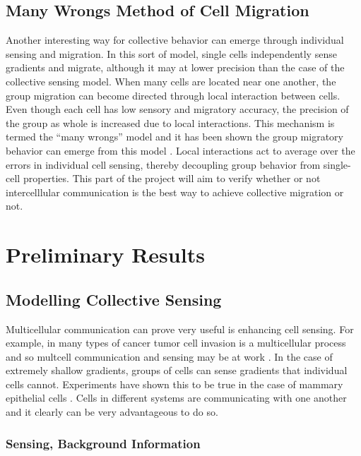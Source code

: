 \documentclass[a4paper]{article}
\begin{document}
\subsection{Many Wrongs Method of Cell Migration}

Another interesting way for collective behavior can emerge through individual sensing and migration. In this sort of model, single cells independently sense gradients and migrate, although it may at lower precision than the case of the collective sensing model. When many cells are located near one another, the group migration can become directed through local interaction between cells. Even though each cell has low sensory and migratory accuracy, the precision of the group as whole is increased due to local interactions. This mechanism is termed the ``many wrongs'' model and it has been shown the group migratory behavior can emerge from this model \cite{simons2004many,coburn2013tactile}. Local interactions act to average over the errors in individual cell sensing, thereby decoupling group behavior from single-cell properties. This part of the project will aim to verify whether or not intercelllular communication is the best way to achieve collective migration or not.

\section{Preliminary Results}

\subsection{Modelling Collective Sensing}

Multicellular communication can prove very useful is enhancing cell sensing. For example, in many types of cancer tumor cell invasion is a multicellular process and so multcell communication and sensing may be at work \cite{cheung2013collective,friedl2012classifying}. In the case of extremely shallow gradients, groups of cells can sense gradients that individual cells cannot. Experiments have shown this to be true in the case of mammary epithelial cells \cite{ellison2015cell}. Cells in different systems are communicating with one another and it clearly can be very advantageous to do so.

\subsubsection{Sensing, Background Information}
\end{document}

